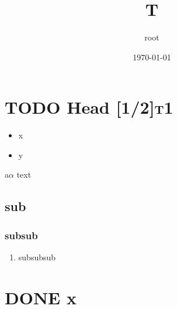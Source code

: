 \documentclass[11pt]{article}
\author{root}
\date{\today}
\title{T}
\begin{document}
\maketitle
\tableofcontents

\section{{\bfseries\sffamily TODO} Head [1/2]\hfill{}\textsc{t1}}
\label{sec:org6220cf0}
\begin{itemize}
\item[{$\square$}] x
\item[{$\boxtimes$}] y
\end{itemize}
a\nb \(\alpha\) text
\subsection{sub}
\label{sec:orgac92bcd}
\subsubsection{subsub}
\label{sec:orge378d14}
\begin{enumerate}
\item subsubsub
\label{sec:org3751be6}
\end{enumerate}
\section{{\bfseries\sffamily DONE} x}
\label{sec:orgcba69a9}
\end{document}
